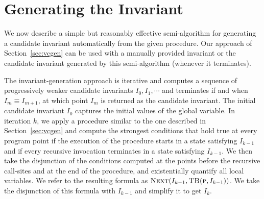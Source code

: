 \section{Generating the Invariant}
\label{sec:invariant}

We now describe a simple but reasonably effective semi-algorithm for
generating a candidate invariant automatically from the given
procedure. Our approach of Section~\ref{sec:vcgen} can be used with a manually
provided invariant or the candidate invariant generated by this
semi-algorithm (whenever it terminates).

The invariant-generation approach is iterative and computes a sequence of progressively weaker
candidate invariants $I_0, I_1, \cdots$ and terminates if and when $I_m \equiv I_{m+1}$, at
which point $I_m$ is returned as the candidate invariant.
%
The initial candidate invariant $I_0$ captures the initial values of the global variable.
In  iteration $k$, we apply a procedure similar to the one described in Section~\ref{sec:vcgen} and
compute the strongest conditions that hold true at every program point if the execution of the
procedure starts in a state satisfying $I_{k-1}$ and if every recursive invocation terminates in a
state satisfying $I_{k-1}$. We then take the disjunction of the conditions computed at the points before the
recursive call-sites and at the end of the procedure, and existentially quantify all local variables.
We refer to the resulting formula as $\textsc{Next}(I_{k-1}, \textsc{TB}(\textsc{p},I_{k-1}))$.
We take the disjunction of this formula with $I_{k-1}$ and simplify it to get $I_k$.

%

